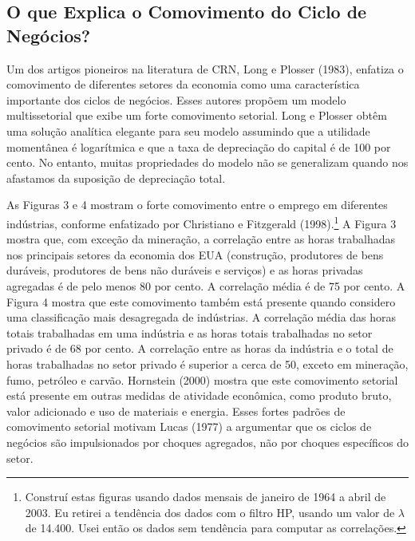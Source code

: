 \documentclass[12pt]{article}
\begin{document}
\subsection*{O que Explica o Comovimento do Ciclo de Negócios?}

Um dos artigos pioneiros na literatura de CRN, Long e Plosser (1983), enfatiza o comovimento de diferentes setores da economia como uma característica importante dos ciclos de negócios. Esses autores propõem um modelo multissetorial que exibe um forte comovimento setorial. Long e Plosser obtêm uma solução analítica elegante para seu modelo assumindo que a utilidade momentânea é logarítmica e que a taxa de depreciação do capital é de 100 por cento. No entanto, muitas propriedades do modelo não se generalizam quando nos afastamos da suposição de depreciação total.

As Figuras 3 e 4 mostram o forte comovimento entre o emprego em diferentes indústrias, conforme enfatizado por Christiano e Fitzgerald (1998).\footnote{Construí estas figuras usando dados mensais de janeiro de 1964 a abril de 2003. Eu retirei a tendência dos dados com o filtro HP, usando um valor de $\lambda$ de 14.400. Usei então os dados sem tendência para computar as correlações.} A Figura 3 mostra que, com exceção da mineração, a correlação entre as horas trabalhadas nos principais setores da economia dos EUA (construção, produtores de bens duráveis, produtores de bens não duráveis e serviços) e as horas privadas agregadas é de pelo menos 80 por cento. A correlação média é de 75 por cento. A Figura 4 mostra que este comovimento também está presente quando considero uma classificação mais desagregada de indústrias. A correlação média das horas totais trabalhadas em uma indústria e as horas totais trabalhadas no setor privado é de 68 por cento. A correlação entre as horas da indústria e o total de horas trabalhadas no setor privado é superior a cerca de 50, exceto em mineração, fumo, petróleo e carvão. Hornstein (2000) mostra que este comovimento setorial está presente em outras medidas de atividade econômica, como produto bruto, valor adicionado e uso de materiais e energia. Esses fortes padrões de comovimento setorial motivam Lucas (1977) a argumentar que os ciclos de negócios são impulsionados por choques agregados, não por choques específicos do setor.
\end{document}
